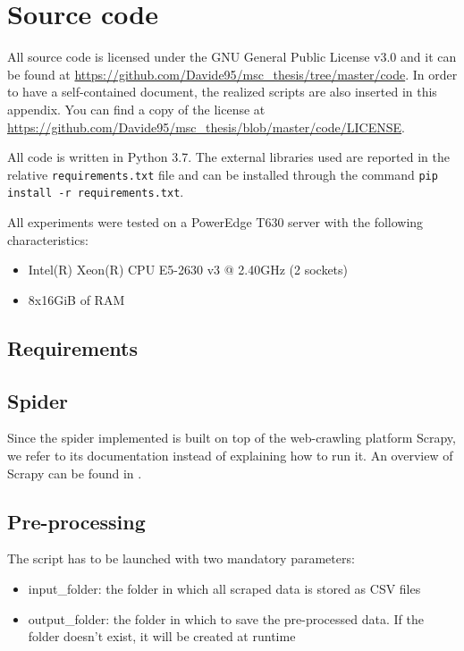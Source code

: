 \chapter{Source code}
All source code is licensed under the GNU General Public License v3.0 and it can be found at \url{https://github.com/Davide95/msc_thesis/tree/master/code}.
In order to have a self-contained document, the realized scripts are also inserted in this appendix.
You can find a copy of the license at \url{https://github.com/Davide95/msc_thesis/blob/master/code/LICENSE}.

All code is written in Python 3.7. The external libraries used are reported in the relative \texttt{requirements.txt} file and can be installed through the command \texttt{pip install -r requirements.txt}.

All experiments were tested on a PowerEdge T630 server with the following characteristics:
\begin{itemize}
    \item Intel(R) Xeon(R) CPU E5-2630 v3 @ 2.40GHz (2 sockets)
    \item 8x16GiB of RAM
\end{itemize}

\section{Requirements}
\begin{minipage}{\linewidth}
    
\end{minipage}

\section{Spider} \label{spider}

Since the spider implemented is built on top of the web-crawling platform Scrapy, we refer to its documentation instead of explaining how to run it.
An overview of Scrapy can be found in \cite{kouzis2016learning}.



\section{Pre-processing} \label{preprocessing}
The script has to be launched with two mandatory parameters:
\begin{itemize}
    \item input\_folder: the folder in which all scraped data is stored as CSV files
    \item output\_folder: the folder in which to save the pre-processed data. If the folder doesn't exist, it will be created at runtime
\end{itemize}

